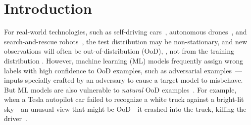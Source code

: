 \documentclass[10pt,twocolumn,letterpaper]{article}
\begin{document}
\begin{abstract}
\end{abstract}


\section{Introduction}

For real-world technologies, such as self-driving cars~\cite{chen2015deepdriving}, autonomous drones~\cite{gandhi2017learning}, and search-and-rescue robots~\cite{sampedro2018fully}, the test distribution may be non-stationary, and new observations will often be out-of-distribution (OoD), \ie, not 
from the training distribution \cite{sugiyama2017dataset}.
However, machine learning (ML) models frequently assign wrong labels with high confidence to OoD examples, such as adversarial examples~\cite{szegedy2013intriguing,nguyen2015deep}---inputs specially crafted by an adversary to cause a target model to misbehave.
But ML models are also vulnerable to \emph{natural} OoD examples~\cite{lambert2016understanding,uber2017killed,tian2017deeptest,tesla2016killed}.
For example, when a Tesla autopilot car failed to recognize a white truck against a bright-lit sky---an unusual view that might be OoD---it crashed into the truck, killing the driver~\cite{tesla2016killed}.
\end{document}

